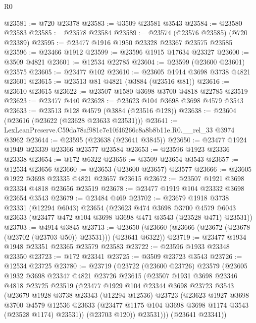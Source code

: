\begin{lexlean}{R0}
\begin{coremodule}
@23581 := @720 @23378
@23583 := @3509 @23581 @3543
@23584 := @23580 @23583
@23585 := @23578 @23584
@23589 := @23574 (@23576 @23585) (@720 @23389)
@23595 := @23477 @1916 @1950 @23328 @23367 @23575 @23585
@23596 := @23466 @1912
@23599 := @23596 @1915 @17634 @23327
@23600 := @3509 @4821
@23601 := @12534 @22785
@23604 := @23599 (@23600 @23601) @23575
@23605 := @23477 @102
@23610 := @23605 @1914 @3698 @3738 @4821 @23601
@23615 := @23513 @81 @4821 (@3884 (@23516 @81))
@23616 := @23610 @23615
@23622 := @23507 @1580 @3698 @3700 @4818 @22785 @23519
@23623 := @23477 @440
@23628 := @23623 @104 @3698 @3698 @4579 @3543
@23633 := @23513 @128 @4579 (@3884 (@23516 @128))
@23638 := @23604 (@23616 (@23622 (@23628 @23633 @23531)))
@23641 := LexLeanPreserve.C59da78af981c7e10f46266c8a8b8b11e.R0.__rel_33 @3974 @3962
@23644 := @23595 (@23638 (@23641 @3845))
@23650 := @23477 @1924 @1949 @23339 @23366 @23577 @23584
@23653 := @23596 @1923 @23336 @23338
@23654 := @172 @6322
@23656 := @3509 @23654 @3543
@23657 := @12534 @23656
@23660 := @23653 (@23600 @23657) @23577
@23666 := @23605 @1922 @3698 @23335 @4821 @23657 @23615
@23672 := @23507 @1921 @3698 @23334 @4818 @23656 @23519
@23678 := @23477 @1919 @104 @23332 @3698 @23654 @3543
@23679 := @23484 @469
@23702 := @23679
    @1918
    @3738
    @23331
    (@12294 @6043)
    @23654
    (@23623
      @474
      @3698
      @3700
      @4579
      @6043
      @23633
      (@23477 @472 @104 @3698 @3698 @471 @3543 (@23528 @471) @23531))
@23703 := @4914 @3845
@23713 := @23650 (@23660 (@23666 (@23672 (@23678 (@23702 (@23703 @50)) @23531))) (@23641 @6322))
@23719 := @23477 @1934 @1948 @23351 @23365 @23579 @23583
@23722 := @23596 @1933 @23348 @23350
@23723 := @172 @23341
@23725 := @3509 @23723 @3543
@23726 := @12534 @23725
@23780 := @23719
    (@23722
      (@23600 @23726)
      @23579
      (@23605
        @1932
        @3698
        @23347
        @4821
        @23726
        @23615
        (@23507
          @1931
          @3698
          @23346
          @4818
          @23725
          @23519
          (@23477
            @1929
            @104
            @23344
            @3698
            @23723
            @3543
            (@23679
              @1928
              @3738
              @23343
              (@12294 @12536)
              @23723
              (@23623
                @1927
                @3698
                @3700
                @4579
                @12536
                @23633
                (@23477 @1175 @104 @3698 @3698 @1174 @3543 (@23528 @1174) @23531))
              (@23703 @120))
            @23531)))
      (@23641 @23341))

\end{coremodule}
\end{lexlean}
